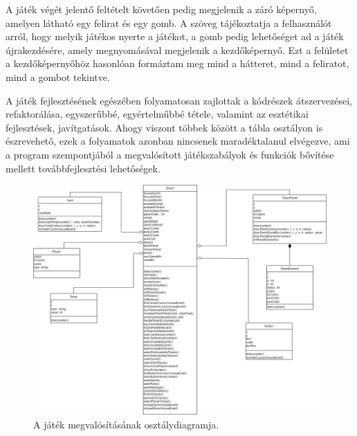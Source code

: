 A játék végét jelentő feltételt követően pedig megjelenik a záró képernyő, amelyen látható egy felirat és egy gomb. A szöveg tájékoztatja a felhasználót arról, hogy melyik játékos nyerte a játékot, a gomb pedig lehetőséget ad a játék újrakezdésére, amely megnyomásával megjelenik a kezdőképernyő. Ezt a felületet a kezdőképernyőhöz hasonlóan formáztam meg mind a hátteret, mind a feliratot, mind a gombot tekintve.

A játék fejlesztésének egészében folyamatosan zajlottak a kódrészek átszervezései, refaktorálása, egyszerűbbé, egyértelműbbé tétele, valamint az esztétikai fejlesztések, javítgatások. Ahogy viszont többek között a tábla osztályon is észrevehető, ezek a folyamatok azonban nincsenek maradéktalanul elvégezve, ami a program szempontjából a megvalósított játékszabályok és funkciók bővítése mellett továbbfejlesztési lehetőségek.


\begin{figure}[h]
\centering
\includegraphics[scale=0.35]{images/UML.png}
\caption{A játék megvalósításának osztálydiagramja.}
\label{fig:uml}
\end{figure}

